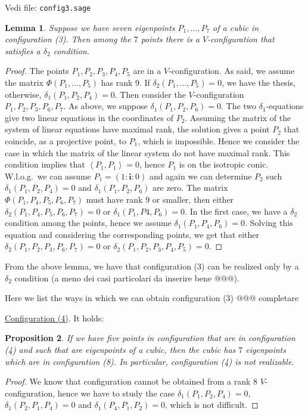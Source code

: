 \documentclass{amsart}
\theoremstyle{plain}
\newtheorem{lemma}{Lemma}[section]
\newtheorem{prop}[lemma]{Proposition}
\theoremstyle{definition}
\newcommand{\scl}[2]{\left\langle {#1}, {#2} \right\rangle}
\newcommand{\iii}{\textbf{i}}
\begin{document}
Vedi file: \verb+config3.sage+
\begin{lemma}
\label{no_delta1_delta1} Suppose we have  seven eigenpoints $P_1, \dots, P_7$
of a cubic in configuration (3). Then among the $7$ points there is a
$V$-configuration that satisfies a $\delta_2$ condition.
\end{lemma}
\begin{proof}
The points $P_1, P_2, P_3, P_4, P_5$ are in a $V$-configuration. As said,
we assume the matrix $\Phi(P_1, \dots, P_5)$ has
rank $9$. If
$\delta_2(P_1, \dots, P_5) = 0$, we have the thesis, otherwise,
$\delta_1(P_1, P_2, P_4) = 0$. Then consider the $V$-configuration
$P_1, P_2, P_3, P_6, P_7$. As above, we suppose $\delta_1(P_1, P_2, P_6) = 0$.
The two $\delta_1$-equations give two linear equations in the coordinates
of $P_2$. Assuming the matrix of the system of linear equations have
maximal rank, the solution gives a point $P_2$ that coincide, as
a projective point, to $P_1$, which is impossible. Hence we consider the
case in which the matrix of the linear system do not have maximal rank.
This condition implies that $\scl{P_1}{P_1} = 0$, hence $P_1$ is on the
isotropic conic. W.l.o.g.\ we can assume $P_1 = (1: \iii: 0)$ and again
we can determine $P_2$ such $\delta_1(P_1, P_2, P_4) = 0$ and
$\delta_1(P_1, P_2, P_6)$ are zero. The matrix $\Phi(P_1, P_4, P_5, P_6, P_7)$
must have rank $9$ or smaller, then either
$\delta_2(P_1, P_4, P_5, P_6, P_7)=0$ or $\delta_1(P_1, P4, P_6) = 0$. In
the first case, we have a $\delta_2$ condition among the points, hence
we assume $\delta_1(P_1, P_4, P_6) = 0$. Solving this equation and
considering the corresponding points, we get that either
$\delta_2(P_1, P_2, P_3, P_6, P_7) = 0$ or
$\delta_2(P_1, P_2, P_3, P_4, P_5) = 0$.
\end{proof}

From the above lemma, we have that configuration (3) can be
realized only by a $\delta_2$ condition (a meno dei casi particolari
da inserire bene @@@).

Here we list the ways in which we can obtain configuration (3)
@@@ completare

\underline{Configuration (4)}. It holds:
\begin{prop}
\label{conf4no} If we have five points in configuration that are in
configuration (4) and such that are eigenpoints of a cubic, then the
cubic has $7$ eigenpoints which are in configuration (8). In particular,
configuration (4) is not realizable.
\end{prop}
\begin{proof}
We know that configuration cannot be obtained from a rank 8 $V$-configuration,
hence we have to study the case $\delta_1(P_1, P_2, P_4) = 0$,
$\delta_1(P_2, P_1, P_4) = 0$ and $\delta_1(P_4, P_1, P_2) = 0$,
which is not difficult.
\end{proof}
\end{document}
